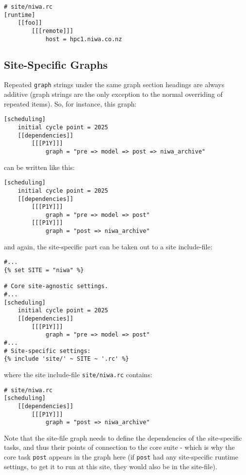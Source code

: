 \begin{lstlisting}
# site/niwa.rc
[runtime]
    [[foo]]
        [[[remote]]]
            host = hpc1.niwa.co.nz
\end{lstlisting}

\subsection{Site-Specific Graphs}

Repeated \lstinline=graph= strings under the same graph section headings are
always additive (graph strings are the only exception to the normal overriding
of repeated items). So, for instance, this graph:

\begin{lstlisting}
[scheduling]
    initial cycle point = 2025
    [[dependencies]]
        [[[P1Y]]]
            graph = "pre => model => post => niwa_archive"
\end{lstlisting}

can be written like this:

\begin{lstlisting}
[scheduling]
    initial cycle point = 2025
    [[dependencies]]
        [[[P1Y]]]
            graph = "pre => model => post"
        [[[P1Y]]]
            graph = "post => niwa_archive"
\end{lstlisting}

and again, the site-specific part can be taken out to a site include-file:

\begin{lstlisting}
#...
{% set SITE = "niwa" %}

# Core site-agnostic settings.
#...
[scheduling]
    initial cycle point = 2025
    [[dependencies]]
        [[[P1Y]]]
            graph = "pre => model => post"
#...
# Site-specific settings:
{% include 'site/' ~ SITE ~ '.rc' %}
\end{lstlisting}

where the site include-file \lstinline=site/niwa.rc= contains:

\begin{lstlisting}
# site/niwa.rc
[scheduling]
    [[dependencies]]
        [[[P1Y]]]
            graph = "post => niwa_archive"
\end{lstlisting}

Note that the site-file graph needs to define the dependencies of the
site-specific tasks, and thus their points of connection to the core suite
- which is why the core task \lstinline=post= appears in the graph here (if
\lstinline=post= had any site-specific runtime settings, to get it to run at
this site, they would also be in the site-file).

